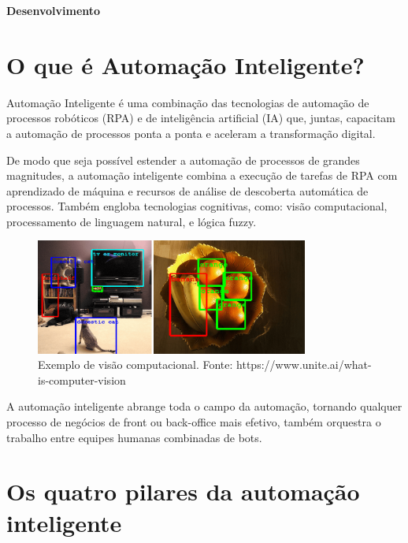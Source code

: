\documentclass[a4paper,12pt]{article}
\begin{document}
	\clearpage
	
	\begin{center}
		\LARGE
		\textbf{Desenvolvimento}
	\end{center}
	\vspace*{0.5 cm}
	
	\section{O que é Automação Inteligente?}

		Automação Inteligente é uma combinação das tecnologias de automação de processos robóticos (RPA) e de inteligência artificial (IA) que, juntas, capacitam a automação de processos ponta a ponta e aceleram a transformação digital.	
		
De modo que seja possível estender a automação de processos de grandes magnitudes, a automação inteligente combina a execução de tarefas de RPA com aprendizado de máquina e recursos de análise de descoberta automática de processos. Também engloba tecnologias cognitivas, como: visão computacional, processamento de linguagem natural, e lógica fuzzy.

	\begin{figure}[h!]
	\centering
  \includegraphics[width=0.8\textwidth]{computer-vision}
   \scriptsize{ \caption{ Exemplo de visão computacional. Fonte: https://www.unite.ai/what-is-computer-vision}}
\end{figure}


A automação inteligente abrange toda o campo da automação, tornando qualquer processo de negócios de front ou back-office mais efetivo, também orquestra o trabalho entre equipes humanas combinadas de bots.

	\section{Os quatro pilares da automação inteligente}
	
 
\end{document}
